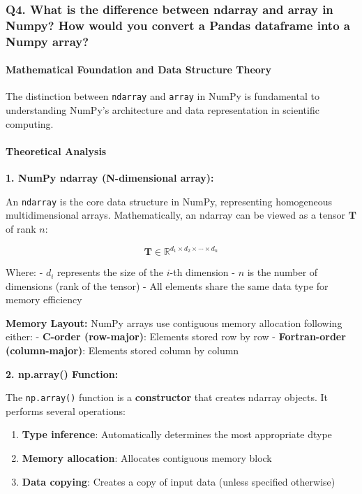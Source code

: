 \documentclass[11pt]{article}
\providecommand{\tightlist}{%
      \setlength{\itemsep}{0pt}\setlength{\parskip}{0pt}}
\begin{document}
    \subsubsection{Q4. What is the difference between ndarray and array in
Numpy? How would you convert a Pandas dataframe into a Numpy
array?}\label{q4.-what-is-the-difference-between-ndarray-and-array-in-numpy-how-would-you-convert-a-pandas-dataframe-into-a-numpy-array}

\paragraph{Mathematical Foundation and Data Structure
Theory}\label{mathematical-foundation-and-data-structure-theory}

The distinction between \texttt{ndarray} and \texttt{array} in NumPy is
fundamental to understanding NumPy's architecture and data
representation in scientific computing.

\paragraph{Theoretical Analysis}\label{theoretical-analysis}

\textbf{1. NumPy ndarray (N-dimensional array):}

An \texttt{ndarray} is the core data structure in NumPy, representing
homogeneous multidimensional arrays. Mathematically, an ndarray can be
viewed as a tensor \(\mathbf{T}\) of rank \(n\):

\[\mathbf{T} \in \mathbb{R}^{d_1 \times d_2 \times \cdots \times d_n}\]

Where: - \(d_i\) represents the size of the \(i\)-th dimension - \(n\)
is the number of dimensions (rank of the tensor) - All elements share
the same data type for memory efficiency

\textbf{Memory Layout:} NumPy arrays use contiguous memory allocation
following either: - \textbf{C-order (row-major)}: Elements stored row by
row - \textbf{Fortran-order (column-major)}: Elements stored column by
column

\textbf{2. np.array() Function:}

The \texttt{np.array()} function is a \textbf{constructor} that creates
ndarray objects. It performs several operations:

\begin{enumerate}
\def\labelenumi{\arabic{enumi}.}
\tightlist
\item
  \textbf{Type inference}: Automatically determines the most appropriate
  dtype
\item
  \textbf{Memory allocation}: Allocates contiguous memory block
\item
  \textbf{Data copying}: Creates a copy of input data (unless specified
  otherwise)
\end{enumerate}
\end{document}
